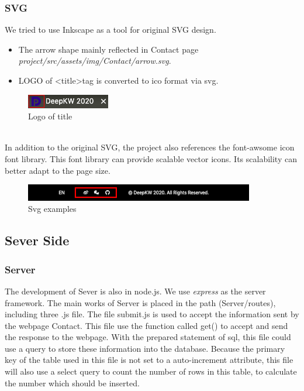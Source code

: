 \documentclass{article}
\begin{document}
\subsubsection{SVG}
We tried to use Inkscape as a tool for original SVG design.
\begin{itemize}
    \item The arrow shape mainly reflected in Contact page \textit{project/src/assets/img/Contact/arrow.svg}.
    \item LOGO  of \textless title\textgreater\space tag is converted to ico format via svg.
\end{itemize} 

\begin{figure}[h]
    \centering
    \includegraphics[]{img/exp/svg1.png}
    \caption{Logo of title}
    \label{}
\end{figure}

~\\
\noindent
In addition to the original SVG, the project also references the 
font-awsome icon font library. This font library can provide 
scalable vector icons. Its scalability can better adapt to the page size.
\begin{figure}[h]
    \centering
    \includegraphics[width=10cm]{img/exp/svg.png}
    \caption{Svg examples}
    \label{}
\end{figure}

\subsection{Sever Side}
\subsubsection{Server}
The development of Sever is also in node.js. We use \textit{express} as the 
server framework. The main works of Server is placed in the path (Server/routes),
including three .js file. The file submit.js is used to accept the information 
sent by the webpage Contact. This file use the function called get() to accept and 
send the response to the webpage. With the prepared statement of sql, this file 
could use a query to store these information into the database. Because the primary
key of the table used in this file is not set to a auto-increment attribute, this
file will also use a select query to count the number of rows in this table, to 
calculate the number which should be inserted.
\end{document}
